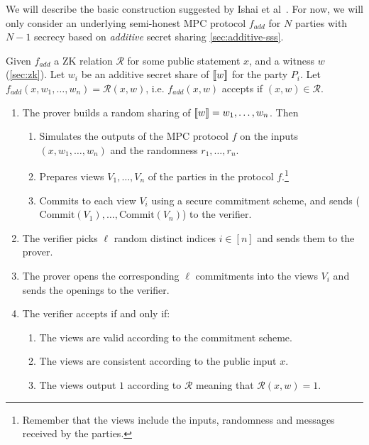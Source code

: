 \documentclass[11pt]{report}
\theoremstyle{definition}
\theoremstyle{plain}
\begin{document}
We will describe the basic construction suggested by Ishai et al~\cite{ishai2007zero}. For now, we will only consider an underlying semi-honest MPC protocol $f_{add}$ for $N$ parties with $N-1$ secrecy based on \textit{additive} secret sharing \autoref{sec:additive-sss}.

\begin{protocol}\label{def:mpcinth_basic}
  Given $f_{add}$ a ZK relation $\mathcal{R}$ for some public statement $x$, and a witness $w$ (\autoref{sec:zk}).
  Let $w_i$ be an additive secret share of $\llbracket w \rrbracket$ for the party $P_i$. Let $f_{add}(x, w_1, \dots, w_n) = \mathcal{R}(x, w)$, i.e. $f_{add}(x,w)$ accepts if $(x,w) \in \mathcal{R}$.

  \begin{enumerate}[parsep=2pt, itemsep=0pt]
    \item The prover builds a random sharing of $\llbracket w \rrbracket = w_1, \dots, w_n$. Then
          \begin{enumerate}[nolistsep]
            \item Simulates the outputs of the MPC protocol $f$ on the inputs $(x, w_1, \dots, w_n)$ and the randomness $r_1, \dots, r_n$.
            \item Prepares views $V_1, \dots, V_n$ of the parties in the protocol $f$.\footnote{Remember that the views include the inputs, randomness and messages received by the parties.}
            \item Commits to each view $V_i$ using a secure commitment scheme, and sends ($\text{Commit}(V_1), \dots, \text{Commit}(V_n)$) to the verifier.
          \end{enumerate}
    \item The verifier picks $\ell$ random distinct indices $i \in [n]$ and sends them to the prover.
    \item The prover opens the corresponding $\ell$ commitments into the views $V_i$ and sends the openings to the verifier.
    \item The verifier accepts if and only if:
          \begin{enumerate}[nolistsep]
            \item\label{prop:mpcinth_commit} The views are valid according to the commitment scheme.
            \item\label{prop:mpcinth_consistent} The views are consistent according to the public input $x$.
            \item\label{prop:mpcinth_knowledge} The views output $1$ according to $\mathcal{R}$ meaning that $\mathcal{R}(x,w) = 1$.
          \end{enumerate}
  \end{enumerate}
\end{protocol}
\end{document}
